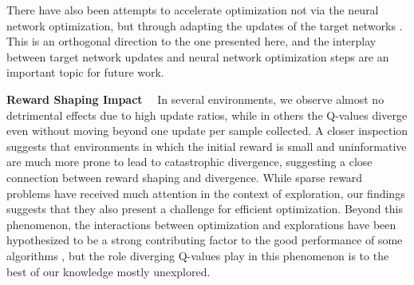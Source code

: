 There have also been attempts to accelerate optimization not via the neural network optimization, but through adapting the updates of the target networks \parencite{vieillard2020momentum,farahmand2021pid}.
This is an orthogonal direction to the one presented here, and the interplay between target network updates and neural network optimization steps are an important topic for future work.


{\bf Reward Shaping Impact}~~ In several environments, we observe almost no detrimental effects due to high update ratios, while in others the Q-values diverge even without moving beyond one update per sample collected.
A closer inspection suggests that environments in which the initial reward is small and uninformative are much more prone to lead to catastrophic divergence, suggesting a close connection between reward shaping and divergence.
While sparse reward problems have received much attention in the context of exploration, our findings suggests that they also present a challenge for efficient optimization.
Beyond this phenomenon, the interactions between optimization and explorations have been hypothesized to be a strong contributing factor to the good performance of some algorithms \parencite{schaul2022phenomenon}, but the role diverging Q-values play in this phenomenon is to the best of our knowledge mostly unexplored.



